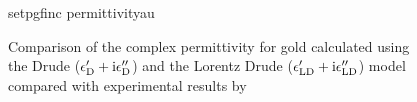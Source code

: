 \begin{figure}[ht]
\centering
{setpgfinc}
{permittivityau}
\caption{Comparison of the complex permittivity for gold calculated using the
				Drude ($\epsilon^\prime_\mathrm{D} + {\mathrm{i}}
				\epsilon^{\prime\prime}_\mathrm{D}$) and the Lorentz Drude
				($\epsilon^\prime_\mathrm{LD} + {\mathrm{i}}
				\epsilon^{\prime\prime}_\mathrm{LD}$) model compared with experimental
				results by ~\cite{theye1970investigation}}
\label{fig:permittivityau} \end{figure}

